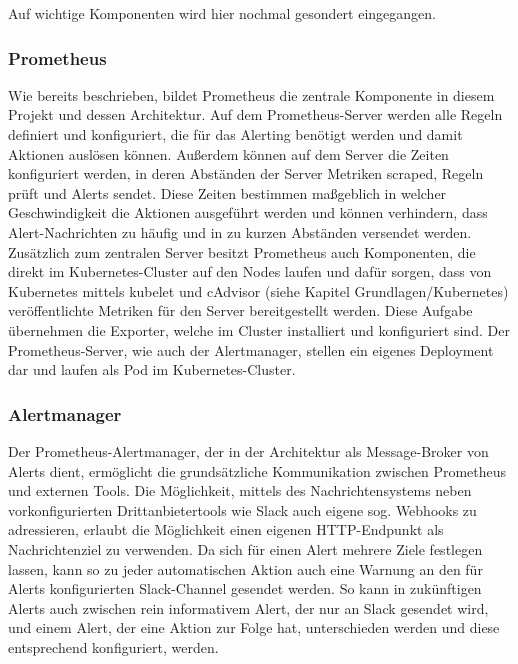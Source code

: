\documentclass[a4paper,10pt]{scrartcl}
\begin{document}
Auf wichtige Komponenten wird hier nochmal gesondert eingegangen.

\subsubsection{Prometheus}

Wie bereits beschrieben, bildet Prometheus die zentrale Komponente in diesem Projekt und dessen Architektur. Auf dem Prometheus-Server werden alle Regeln definiert und konfiguriert, die für das Alerting benötigt werden und damit Aktionen auslösen können. Außerdem können auf dem Server die Zeiten konfiguriert werden, in deren Abständen der Server Metriken scraped, Regeln prüft und Alerts sendet. Diese Zeiten bestimmen maßgeblich in welcher Geschwindigkeit die Aktionen ausgeführt werden und können verhindern, dass Alert-Nachrichten zu häufig und in zu kurzen Abständen versendet werden.\\

Zusätzlich zum zentralen Server besitzt Prometheus auch Komponenten, die direkt im Kubernetes-Cluster auf den Nodes laufen und dafür sorgen, dass von Kubernetes mittels kubelet und cAdvisor (siehe Kapitel Grundlagen/Kubernetes) veröffentlichte Metriken für den Server bereitgestellt werden. Diese Aufgabe übernehmen die Exporter, welche im Cluster installiert und konfiguriert sind.
Der Prometheus-Server, wie auch der Alertmanager, stellen ein eigenes Deployment dar und laufen als Pod im Kubernetes-Cluster. 

\subsubsection{Alertmanager}

Der Prometheus-Alertmanager, der in der Architektur als Message-Broker von Alerts dient, ermöglicht die grundsätzliche Kommunikation zwischen Prometheus und externen Tools. Die Möglichkeit, mittels des Nachrichtensystems neben vorkonfigurierten Drittanbietertools wie Slack auch eigene sog. Webhooks zu adressieren, erlaubt die Möglichkeit einen eigenen HTTP-Endpunkt als Nachrichtenziel zu verwenden. Da sich für einen Alert mehrere Ziele festlegen lassen, kann so zu jeder automatischen Aktion auch eine Warnung an den für Alerts konfigurierten Slack-Channel gesendet werden. So kann in zukünftigen Alerts auch zwischen rein informativem Alert, der nur an Slack gesendet wird, und einem Alert, der eine Aktion zur Folge hat, unterschieden werden und diese entsprechend konfiguriert, werden.\\
\end{document}
